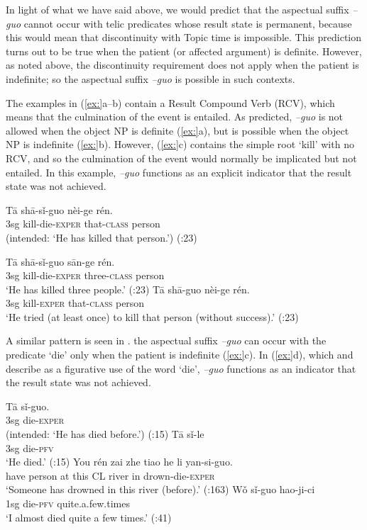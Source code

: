 In light of what we have said above, we would predict that the aspectual suffix \textit{–guo} cannot occur with telic predicates whose result state is permanent, because this would mean that discontinuity with Topic time is impossible. This prediction turns out to be true when the patient (or affected argument) is definite. However, as noted above, the discontinuity requirement does not apply when the patient is indefinite; so the aspectual suffix \textit{–guo} is possible in such contexts.



The examples in (\ref{ex:}a--b) contain a Result Compound Verb (RCV), which means that the culmination of the event is entailed. As predicted, \textit{–guo} is not allowed when the object NP is definite (\ref{ex:}a), but is possible when the object NP is indefinite (\ref{ex:}b). However, (\ref{ex:}c) contains the simple root ‘kill’ with no RCV, and so the culmination of the event would normally be implicated but not entailed. In this example, \textit{–guo} functions as an explicit indicator that the result state was not achieved.


\ea
\ea \gll *T\=a  sh\=a-sǐ-guo  nèi-ge  rén.\\
 3sg  kill-die-\textsc{exper}  that-\textsc{class}  person\\
\glt (intended: ‘He has killed that person.’)  (\citealt{Ma1977}:23)

\ex \gll  T\=a  sh\=a-sǐ-guo  s\=an-ge  rén.\\
3sg  kill-die-\textsc{exper}  three-\textsc{class}  person\\
\glt ‘He has killed three people.’  (\citealt{Ma1977}:23)
\ex \gll  T\=a  sh\=a-guo  nèi-ge  rén.\\
3sg  kill-\textsc{exper}  that-\textsc{class}  person\\
\glt ‘He tried (at least once) to kill that person (without success).’  (\citealt{Ma1977}:23)
\z \z


A similar pattern is seen in . the aspectual suffix \textit{–guo} can occur with the predicate ‘die’ only when the patient is indefinite (\ref{ex:}c). In (\ref{ex:}d), which \citet{Chu1998} and \citet{XiaoMcEnery2004} describe as a figurative use of the word ‘die’, \textit{–guo} functions as an indicator that the result state was not achieved.


\ea
\ea \gll  *T\=a  sǐ-guo.\\
 3sg  die-\textsc{exper}\\
\glt (intended: ‘He has died before.’)  (\citealt{Ma1977}:15)
\ex \gll T\=a  sǐ-le\\
3sg  die-\textsc{pfv}\\
\glt ‘He died.’  (\citealt{Ma1977}:15)
\ex \gll  You  rén  zai  zhe  tiao  he  li  yan-si-guo.\\
have  person  at  this  CL  river  in  drown-die-\textsc{exper}\\
\glt ‘Someone has drowned in this river (before).’  (\citealt{Yeh1996}:163)
\ex \gll  Wǒ  sǐ-guo  hao-ji-ci\\
1sg  die-\textsc{pfv} quite.a.few.times\\
\glt ‘I almost died quite a few times.’  (\citealt{Chu1998}:41)
\z \z


